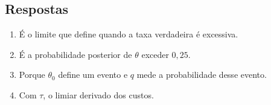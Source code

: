 \documentclass[11pt,letter]{article}
\begin{document}
\subsection*{Respostas}

\begin{enumerate}
  \item É o limite que define quando a taxa verdadeira é excessiva.
  \item É a probabilidade posterior de $\theta$ exceder $0{,}25$.
  \item Porque $\theta_0$ define um evento e $q$ mede a probabilidade desse
        evento.
  \item Com $\tau$, o limiar derivado dos custos.
\end{enumerate}
\end{document}
